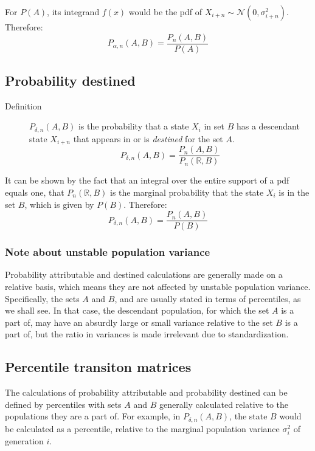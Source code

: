 \documentclass[letterpaper,10pt]{article} %
\begin{document}
For $P(A)$, its integrand $f(x)$ would be the pdf of $X_{i+n} \sim \mathcal{N}(0, \sigma_{i+n}^2)$. Therefore:
%
$$P_{\alpha , n}(A, B) = \frac{P_n(A, B)}{P(A)}$$

\subsection{Probability destined}

\begin{description}
\item [Definition] $P_{\delta , n}(A, B)$ is the probability that a state $X_i$ in set $B$ has a descendant state $X_{i+n}$ that appears in or is \emph{destined} for the set $A$. 
$$P_{\delta , n}(A, B) = \frac{P_n(A, B)}{P_n(\mathbb{R}, B)}$$
\end{description}

It can be shown by the fact that an integral over the entire support of a pdf equals one, that $P_n(\mathbb{R}, B)$ is the marginal probability that the state $X_i$ is in the set $B$, which is given by $P(B)$. Therefore:
%
$$P_{\delta , n}(A, B) = \frac{P_n(A, B)}{P(B)}$$


\subsubsection*{Note about unstable population variance}
Probability attributable and destined calculations are generally made on a relative basis, which means they are not affected by unstable population variance. Specifically, the sets $A$ and $B$, and are usually stated in terms of percentiles, as we shall see. In that case, the descendant population, for which the set $A$ is a part of, may have an absurdly large or small variance relative to the set $B$ is a part of, but the ratio in variances is made irrelevant due to standardization.


\subsection{Percentile transiton matrices}

The calculations of probability attributable and probability destined can be defined by percentiles with sets $A$ and $B$ generally calculated relative to the populations they are a part of. For example, in $P_{\delta , n}(A, B)$, the state $B$ would be calculated as a percentile, relative to the marginal population variance $\sigma_i^2$ of generation $i$. 
\end{document}
